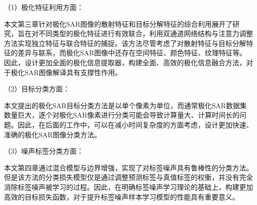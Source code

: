 （1）极化特征利用方面：

本文第三章针对极化SAR图像的散射特征和目标分解特征的综合利用展开了研究，旨在对不同类型的极化特征进行有效联合，利用双通道网络结构与注意力调整方法实现独立特征与联合特征的捕捉。该方法尽管考虑了对散射特征与目标分解特征的差异与联系，而极化SAR图像中还存在空间特征、颜色特征、纹理特征等。因此，设计更加全面的极化信息提取器，构建全面、高效的极化信息融合方法，对于极化SAR图像解译具有支撑性作用。

（2）目标分类方面：

本文提出的极化SAR目标分类方法是以单个像素为单位，而通常极化SAR数据集数量巨大，逐个对极化SAR像素进行分类可能会导致计算量大、计算时间长的问题。因此，在后面的工作中，可以在减小时间复杂度的方面考虑，设计更加快速、准确的极化SAR图像分类方法。

（3）噪声标签分类方面：

本文第四章通过混合模型与边界增强，实现了对标签噪声具有鲁棒性的分类方法。但是该方法的分类损失模型仅是通过调整预测标签与真值标签的权衡，并没有完全消除标签噪声被学习的过程。因此，在明确标签噪声学习理论的基础上，构建更加高效的目标损失函数，对于提升标签噪声样本学习模型的性能具有重要意义。


